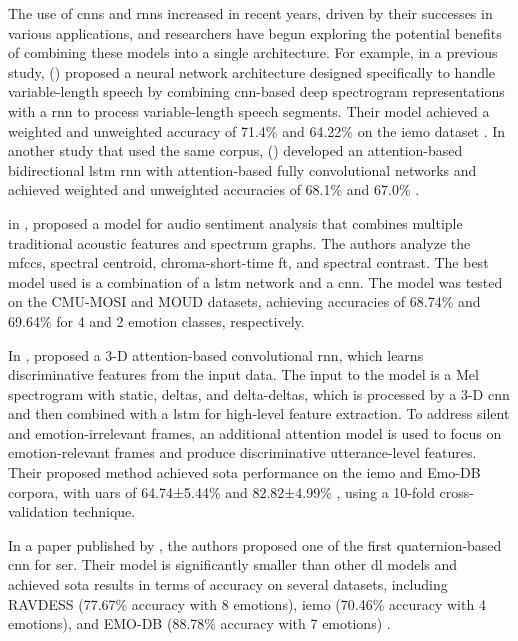 The use of \acp{cnn} and \acp{rnn} increased in recent years, driven by their successes in various applications, and researchers have begun exploring the potential benefits of combining these models into a single architecture. For example, in a previous study, \citeauthor{ma18b_interspeech} (\citeyear{ma18b_interspeech}) proposed a neural network architecture designed specifically to handle variable-length speech by combining \ac{cnn}-based deep spectrogram representations with a \ac{rnn} to process variable-length speech segments. Their model achieved a weighted and unweighted accuracy of 71.4\% and 64.22\% on the \ac{iemo} dataset \cite{ma18b_interspeech}. In another study that used the same corpus, \citeauthor{Zhao2019} (\citeyear{Zhao2019}) developed an attention-based bidirectional \ac{lstm} \ac{rnn} with attention-based fully convolutional networks and achieved weighted and unweighted accuracies of 68.1\% and 67.0\% \cite{Zhao2019}.

\citeauthor{Luo2018} in \citeyear{Luo2018}, proposed a model for audio sentiment analysis that combines multiple traditional acoustic features and spectrum graphs. The authors analyze the \ac{mfccs}, spectral centroid, chroma-short-time \ac{ft}, and spectral contrast. The best model used is a combination of a \ac{lstm} network and a \ac{cnn}. The model was tested on the CMU-MOSI and MOUD datasets, achieving accuracies of 68.74\% and 69.64\% for 4 and 2 emotion classes, respectively.

In \citeyear{8421023}, \citeauthor{8421023} proposed a 3-D attention-based convolutional \ac{rnn}, which learns discriminative features from the input data. The input to the model is a Mel spectrogram with static, deltas, and delta-deltas, which is processed by a 3-D \ac{cnn} and then combined with a \ac{lstm} for high-level feature extraction. To address silent and emotion-irrelevant frames, an additional attention model is used to focus on emotion-relevant frames and produce discriminative utterance-level features. Their proposed method achieved \ac{sota} performance on the \ac{iemo} and Emo-DB corpora, with \acp{uar} of 64.74±5.44\% and 82.82±4.99\% \cite{8421023}, using a 10-fold cross-validation technique.

In a paper published by \citeauthor{Muppidi2021}, the authors proposed one of the first quaternion-based \ac{cnn} for \ac{ser}. Their model is significantly smaller than other \ac{dl} models and achieved \ac{sota} results in terms of accuracy on several datasets, including RAVDESS (77.67\% accuracy with 8 emotions), \ac{iemo} (70.46\% accuracy with 4 emotions), and EMO-DB (88.78\% accuracy with 7 emotions) \cite{Muppidi2021}.


